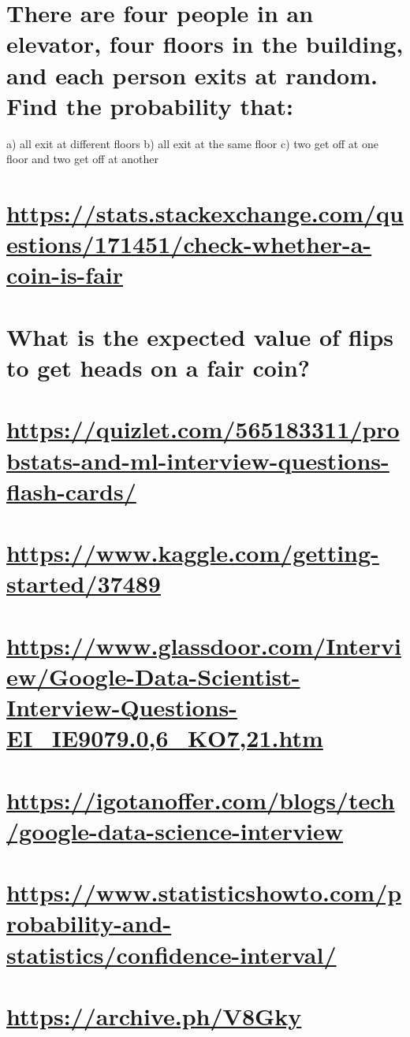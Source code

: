 \documentclass[11pt]{article}
\author{Sreejith Sreekumar}
\date{\today}
\title{}
\begin{document}
\tableofcontents

\section{There are four people in an elevator, four floors in the building, and each person exits at random. Find the probability that:}
\label{sec:org6993eb6}
a) all exit at different floors
b) all exit at the same floor
c) two get off at one floor and two get off at another
\section{\url{https://stats.stackexchange.com/questions/171451/check-whether-a-coin-is-fair}}
\label{sec:org4e0b02e}
\section{What is the expected value of flips to get heads on a fair coin?}
\label{sec:org8cdb455}
\section{\url{https://quizlet.com/565183311/probstats-and-ml-interview-questions-flash-cards/}}
\label{sec:orgf623624}
\section{\url{https://www.kaggle.com/getting-started/37489}}
\label{sec:orgbbf5015}
\section{\url{https://www.glassdoor.com/Interview/Google-Data-Scientist-Interview-Questions-EI\_IE9079.0,6\_KO7,21.htm}}
\label{sec:org600a48b}
\section{\url{https://igotanoffer.com/blogs/tech/google-data-science-interview}}
\label{sec:org7db2978}
\section{\url{https://www.statisticshowto.com/probability-and-statistics/confidence-interval/}}
\label{sec:org4dd1827}
\section{\url{https://archive.ph/V8Gky}}
\label{sec:org4ef39c0}
\end{document}
